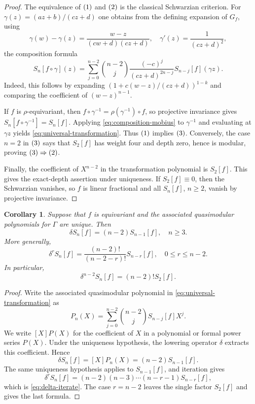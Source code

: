 \documentclass[11pt]{amsart}
\newtheorem{cor}[thm]{Corollary}
\theoremstyle{definition}
\theoremstyle{remark}
\numberwithin{equation}{section}
\begin{document}
\begin{proof}
The equivalence of \({\rm (1)}\) and \({\rm (2)}\) is the classical Schwarzian criterion. For
\(
\gamma(z)=(az+b)/(cz+d)
\)
one obtains from the defining expansion of \(G_f\), using
\[
\gamma(w)-\gamma(z)=\frac{w-z}{(cw+d)(cz+d)},
\quad
\gamma'(z)=\frac1{(cz+d)^2},
\]
the composition formula
\begin{equation}\label{eq:composition-mobius}
S_n[f\circ\gamma](z)
=
\sum_{j=0}^{n-2}\binom{n-2}{j}
\frac{(-c)^j}{(cz+d)^{2n-j}}
S_{n-j}[f](\gamma z).
\end{equation}
Indeed, this follows by expanding
\(
(1+c(w-z)/(cz+d))^{1-k}
\)
and comparing the coefficient of \((w-z)^{n-1}\).

If \(f\) is \(\rho\)-equivariant, then
\(
f\circ\gamma^{-1}=\rho(\gamma^{-1})\circ f
\), so projective invariance gives
\(
S_n[f\circ\gamma^{-1}]=S_n[f]
\). Applying \eqref{eq:composition-mobius} to \(\gamma^{-1}\) and evaluating at \(\gamma z\) yields \eqref{eq:universal-transformation}. Thus \({\rm (1)}\) implies \({\rm (3)}\). Conversely, the case \(n=2\) in \({\rm (3)}\) says that \(S_2[f]\) has weight four and depth zero, hence is modular, proving \({\rm (3)}\Rightarrow{\rm (2)}\).

Finally, the coefficient of \(X^{n-2}\) in the transformation polynomial is \(S_2[f]\). This gives the exact-depth assertion under uniqueness. If \(S_2[f]\equiv0\), then the Schwarzian vanishes, so \(f\) is linear fractional and all \(S_n[f]\), \(n\ge2\), vanish by projective invariance.
\end{proof}

\begin{cor}\label{cor:lowering}
Suppose that $f$ is equivariant and the associated quasimodular polynomials for $\Gamma$ are unique. Then
\begin{equation*}
\delta S_n[f]=(n-2)S_{n-1}[f],
\quad n\geq3.
\end{equation*}
More generally,
\begin{equation}\label{eq:delta-iterate}
\delta^rS_n[f]
=
\frac{(n-2)!}{(n-2-r)!}S_{n-r}[f],
\quad 0\leq r\leq n-2.
\end{equation}
In particular,
\[
\delta^{n-2}S_n[f]=(n-2)!S_2[f].
\]
\end{cor}

\begin{proof}
Write the associated quasimodular polynomial in \eqref{eq:universal-transformation} as
\[
P_n(X)=\sum_{j=0}^{n-2}\binom{n-2}{j}S_{n-j}[f]X^j.
\]
We write $[X]P(X)$ for the coefficient of $X$ in a polynomial or formal power series $P(X)$. Under the uniqueness hypothesis, the lowering operator $\delta$ extracts this coefficient. Hence
\[
\delta S_n[f]=[X]P_n(X)=(n-2)S_{n-1}[f].
\]
The same uniqueness hypothesis applies to $S_{n-1}[f]$, and iteration gives
\[
\delta^rS_n[f]
=(n-2)(n-3)\cdots(n-r-1)S_{n-r}[f],
\]
which is \eqref{eq:delta-iterate}. The case $r=n-2$ leaves the single factor $S_2[f]$ and gives the last formula.
\end{proof}
\end{document}
